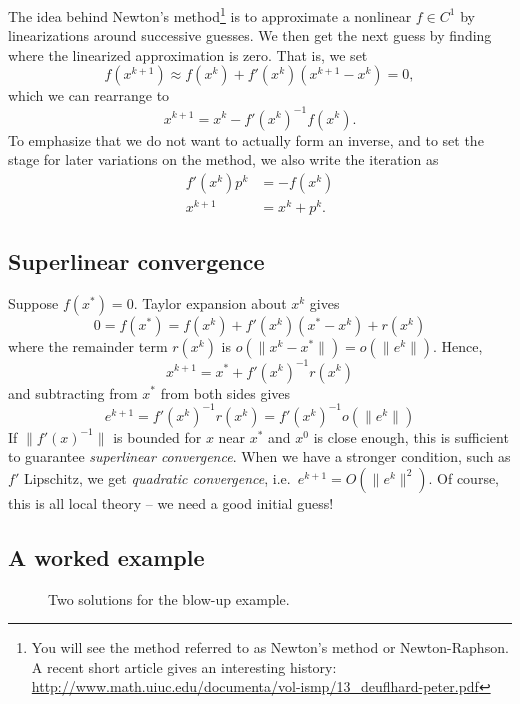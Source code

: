 \documentclass[12pt, leqno]{article} %
\begin{document}
The idea behind Newton's method\footnote{%
You will see the method referred to as Newton's method or
Newton-Raphson.  A recent short article gives an
interesting history: \\
\url{http://www.math.uiuc.edu/documenta/vol-ismp/13_deuflhard-peter.pdf}
}
is to approximate a nonlinear $f \in C^1$ by linearizations
around successive guesses.  We then get the next guess by
finding where the linearized approximation is zero.  That is,
we set
\[
  f(x^{k+1}) \approx f(x^k) + f'(x^k) (x^{k+1}-x^k) = 0,
\]
which we can rearrange to
\[
  x^{k+1} = x^k - f'(x^k)^{-1} f(x^k).
\]
To emphasize that we do not want to actually form an inverse,
and to set the stage for later variations on the method,
we also write the iteration as
\begin{align*}
  f'(x^k) p^k &= -f(x^k) \\
  x^{k+1} &= x^k + p^k.
\end{align*}

\subsection*{Superlinear convergence}

Suppose $f(x^*) = 0$.  Taylor expansion about $x^k$ gives
\[
  0 = f(x^*) = f(x^k) + f'(x^k) (x^*-x^k) + r(x^k)
\]
where the remainder term $r(x^k)$ is $o(\|x^k-x^*\|) = o(\|e^k\|)$.  Hence,
\[
  x^{k+1} = x^* + f'(x^k)^{-1} r(x^k)
\]
and subtracting from $x^*$ from both sides gives
\[
  e^{k+1} = f'(x^k)^{-1} r(x^k) = f'(x^k)^{-1} o(\|e^k\|)
\]
If $\|f'(x)^{-1}\|$ is bounded for $x$ near $x^*$ and $x^0$ is close
enough, this is sufficient to guarantee {\em superlinear convergence}.
When we have a stronger condition, such as $f'$ Lipschitz,
we get {\em quadratic convergence}, i.e.~$e^{k+1} = O(\|e^k\|^2)$.
Of course, this is all local theory -- we need a good initial guess!

\subsection*{A worked example}


\begin{figure}
\hspace{0.08\textwidth}
\caption{Two solutions for the blow-up example.}
\label{fig:soln}
\end{figure}
\end{document}

